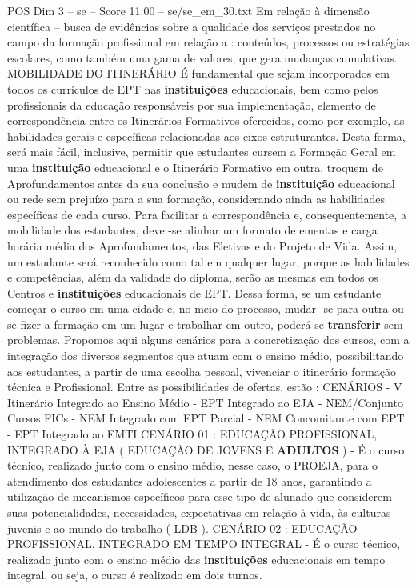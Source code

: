 \begin{textsample}{POS Dim 3 – se – Score 11.00 – se/se\_em\_30.txt}
Em relação à dimensão científica – busca de evidências sobre a qualidade dos serviços prestados no campo da formação profissional em relação a : conteúdos, processos ou estratégias escolares, como também uma gama de valores, que gera mudanças cumulativas.
MOBILIDADE DO ITINERÁRIO É fundamental que sejam incorporados em todos os currículos de EPT nas \textbf{instituições} educacionais, bem como pelos profissionais da educação responsáveis por sua implementação, elemento de correspondência entre os Itinerários Formativos oferecidos, como por exemplo, as habilidades gerais e específicas relacionadas aos eixos estruturantes.
Desta forma, será mais fácil, inclusive, permitir que estudantes cursem a Formação Geral em uma \textbf{instituição} educacional e o Itinerário Formativo em outra, troquem de Aprofundamentos antes da sua conclusão e mudem de \textbf{instituição} educacional ou rede sem prejuízo para a sua formação, considerando ainda as habilidades específicas de cada curso.
Para facilitar a correspondência e, consequentemente, a mobilidade dos estudantes, deve -se alinhar um formato de ementas e carga horária média dos Aprofundamentos, das Eletivas e do Projeto de Vida.
Assim, um estudante será reconhecido como tal em qualquer lugar, porque as habilidades e competências, além da validade do diploma, serão as mesmas em todos os Centros e \textbf{instituições} educacionais de EPT.
Dessa forma, se um estudante começar o curso em uma cidade e, no meio do processo, mudar -se para outra ou se fizer a formação em um lugar e trabalhar em outro, poderá se \textbf{transferir} sem problemas.
Propomos aqui alguns cenários para a concretização dos cursos, com a integração dos diversos segmentos que atuam com o ensino médio, possibilitando aos estudantes, a partir de uma escolha pessoal, vivenciar o itinerário formação técnica e Profissional.
Entre as possibilidades de ofertas, estão : CENÁRIOS - V Itinerário Integrado ao Ensino Médio - EPT Integrado ao EJA - NEM/Conjunto Cursos FICs - NEM Integrado com EPT Parcial - NEM Concomitante com EPT - EPT Integrado ao EMTI CENÁRIO 01 : EDUCAÇÃO PROFISSIONAL, INTEGRADO À EJA ( EDUCAÇÃO DE JOVENS E \textbf{ADULTOS} ) - É o curso técnico, realizado junto com o ensino médio, nesse caso, o PROEJA, para o atendimento dos estudantes adolescentes a partir de 18 anos, garantindo a utilização de mecanismos específicos para esse tipo de alunado que considerem suas potencialidades, necessidades, expectativas em relação à vida, às culturas juvenis e ao mundo do trabalho ( LDB ).
CENÁRIO 02 : EDUCAÇÃO PROFISSIONAL, INTEGRADO EM TEMPO INTEGRAL - É o curso técnico, realizado junto com o ensino médio das \textbf{instituições} educacionais em tempo integral, ou seja, o curso é realizado em dois turnos.

\end{textsample}
